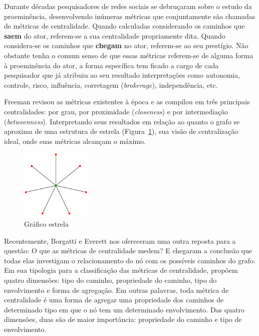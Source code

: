 \documentclass{article}
\begin{document}
Durante décadas pesquisadores de redes sociais se debruçaram sobre o estudo da
proeminência, desenvolvendo inúmeras métricas que conjuntamente são chamadas de
métricas de centralidade. Quando calculadas considerando os caminhos que
\textbf{saem} do ator, referem-se a sua centralidade propriamente dita. Quando
considera-se os caminhos que \textbf{chegam} no ator, referem-se ao seu
prestígio. Não obstante tenha o comum senso de que essas métricas referem-se de
alguma forma à proeminência do ator, a forma específica tem ficado a cargo de
cada pesquisador que já atribuiu ao seu resultado interpretações como autonomia,
controle, risco, influência, corretagem (\textit{brokerage}), independência,
etc.

Freeman revisou as métricas existentes à época \cite{Freeman1979} e as compilou
em três principais centralidades: por grau, por proximidade (\textit{closeness})
e por intermediação (\textit{betweenness}). Interpretando seus resultados em
relação ao quanto o grafo se aproxima de uma estrutura de estrela
(Figura~\ref{fig:star}), sua visão de centralização ideal, onde suas métricas
alcançam o máximo.

\begin{figure}[h!]
  \caption{Gráfico estrela}
  \label{fig:star}
  \centering
    \includegraphics[width=0.3\textwidth]{imgs/star.png}
\end{figure}

Recentemente, Borgatti e Everett \cite{Borgatti2006} nos ofereceram uma
outra reposta para a questão: O que as métricas de centralidade medem? E
chegaram a conclusão que todas elas investigam o relacionamento do nó com os
possíveis caminhos do grafo. Em sua tipologia para a classificação das
métricas de centralidade, propõem quatro dimensões: tipo do caminho,
propriedade do caminho, tipo do envolvimento e forma de agregação. Em outras
palavras, toda métrica de centralidade é uma forma de agregar uma propriedade
dos caminhos de determinado tipo em que o nó tem um determinado envolvimento.
Das quatro dimensões, duas são de maior importância: propriedade do caminho e
tipo de envolvimento. 
\end{document}

